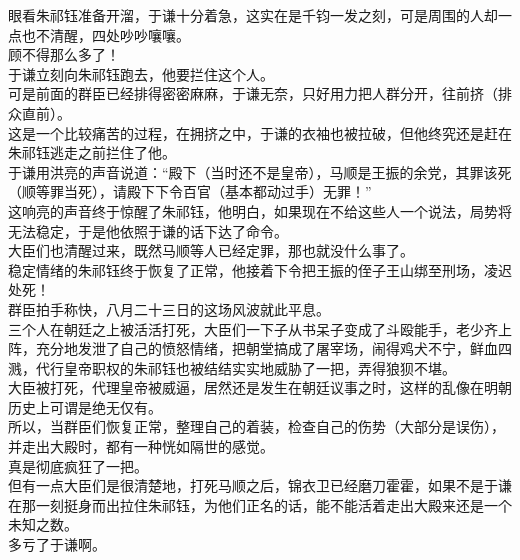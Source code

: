 \begin{multicols}{\theparacolNo}
眼看朱祁钰准备开溜，于谦十分着急，这实在是千钧一发之刻，可是周围的人却一点也不清醒，四处吵吵嚷嚷。\\

顾不得那么多了！\\

于谦立刻向朱祁钰跑去，他要拦住这个人。\\

可是前面的群臣已经排得密密麻麻，于谦无奈，只好用力把人群分开，往前挤（排众直前）。\\

这是一个比较痛苦的过程，在拥挤之中，于谦的衣袖也被拉破，但他终究还是赶在朱祁钰逃走之前拦住了他。\\

于谦用洪亮的声音说道：“殿下（当时还不是皇帝），马顺是王振的余党，其罪该死（顺等罪当死），请殿下下令百官（基本都动过手）无罪！”\\

这响亮的声音终于惊醒了朱祁钰，他明白，如果现在不给这些人一个说法，局势将无法稳定，于是他依照于谦的话下达了命令。\\

大臣们也清醒过来，既然马顺等人已经定罪，那也就没什么事了。\\

稳定情绪的朱祁钰终于恢复了正常，他接着下令把王振的侄子王山绑至刑场，凌迟处死！\\

群臣拍手称快，八月二十三日的这场风波就此平息。\\

三个人在朝廷之上被活活打死，大臣们一下子从书呆子变成了斗殴能手，老少齐上阵，充分地发泄了自己的愤怒情绪，把朝堂搞成了屠宰场，闹得鸡犬不宁，鲜血四溅，代行皇帝职权的朱祁钰也被结结实实地威胁了一把，弄得狼狈不堪。\\

大臣被打死，代理皇帝被威逼，居然还是发生在朝廷议事之时，这样的乱像在明朝历史上可谓是绝无仅有。\\

所以，当群臣们恢复正常，整理自己的着装，检查自己的伤势（大部分是误伤），并走出大殿时，都有一种恍如隔世的感觉。\\

真是彻底疯狂了一把。\\

但有一点大臣们是很清楚地，打死马顺之后，锦衣卫已经磨刀霍霍，如果不是于谦在那一刻挺身而出拉住朱祁钰，为他们正名的话，能不能活着走出大殿来还是一个未知之数。\\

多亏了于谦啊。\\


\end{multicols}
